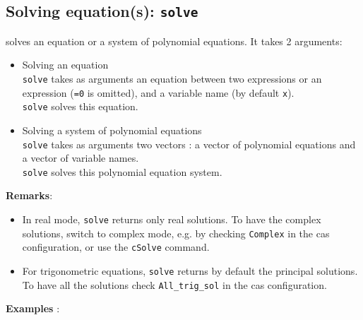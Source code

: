 \documentclass[a4paper,11pt]{book}
\begin{document}
\subsection{Solving equation(s): {\tt solve}}
 solves an equation or a system of polynomial
equations. It takes 2 arguments:
\begin{itemize}
\item Solving an equation\\
{\tt solve} takes as arguments  an equation between two expressions or an 
expression ({\tt =0} is omitted), and a variable name (by default {\tt x}).\\
{\tt solve}  solves this equation.
\item Solving a system of polynomial equations\\
{\tt solve} takes as arguments two vectors : 
a vector of polynomial equations and a 
vector of variable names. \\ 
{\tt solve} solves this polynomial equation system.
\end{itemize}
{\bf Remarks}:
\begin{itemize}
\item In real mode, {\tt solve} returns only real solutions. To have 
the complex solutions, switch to complex mode, e.g. by checking 
{\tt Complex} in the cas configuration, or use the {\tt cSolve}
command.
\item
For trigonometric equations, {\tt solve} returns by default the principal
solutions. To have all the solutions check {\tt All\_trig\_sol} in the cas
configuration.
\end{itemize}
{\bf Examples} :
\end{document}
